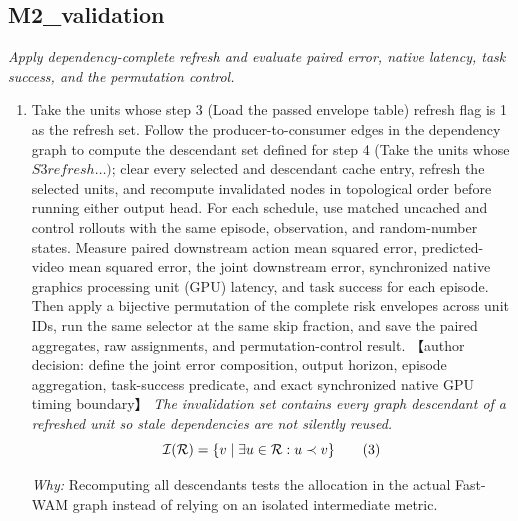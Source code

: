 \documentclass[10pt,a4paper]{article}
\begin{document}
\subsection*{M2\_validation}
\emph{Apply dependency-complete refresh and evaluate paired error, native latency, task success, and the permutation control.}
\begin{enumerate}[leftmargin=*,start=4]
  \item Take the units whose step 3 (Load the passed envelope table) refresh flag is 1 as the refresh set. Follow the producer-to-consumer edges in the dependency graph to compute the descendant set defined for step 4 (Take the units whose \(S3 refresh\dots )\);\allowbreak{} clear every selected and descendant cache entry, refresh the selected units, and recompute invalidated nodes in topological order before running either output head. For each schedule, use matched uncached and control rollouts with the same episode, observation, and random-number states. Measure paired downstream action mean squared error, predicted-video mean squared error, the joint downstream error, synchronized native graphics processing unit (GPU) latency, and task success for each episode. Then apply a bijective permutation of the complete risk envelopes across unit IDs, run the same selector at the same skip fraction, and save the paired aggregates, raw assignments, and permutation-control result. 【author decision: define the joint error composition, output horizon, episode aggregation, task-success predicate, and exact synchronized native GPU timing boundary】
\noindent\emph{The invalidation set contains every graph descendant of a refreshed unit so stale dependencies are not silently reused.}
\begin{equation}
\resizebox{\ifdim\width>\linewidth \linewidth\else\width\fi}{!}{$\displaystyle \mathcal{I}(\mathcal{R})=\{v\mid \exists u\in\mathcal{R}:u\prec v\}$} \tag{3}
\end{equation}
\par\emph{Why:} Recomputing all descendants tests the allocation in the actual Fast-WAM graph instead of relying on an isolated intermediate metric.
\end{enumerate}
\end{document}
